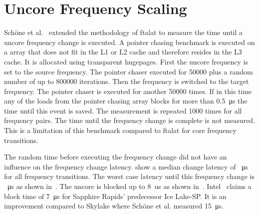 \section{Uncore Frequency Scaling}
\label{sec:uncore_frequency_scaling}
Schöne et al.~\cite{Schoene_2019_SKL} extended the methodology of ftalat to measure the time until a uncore frequency change is executed.
A pointer chasing benchmark is executed on a array that does not fit in the L1 or L2 cache and therefore resides in the L3 cache.
It is allocated using transparent hugepages.
First the uncore frequency is set to the source frequency.
The pointer chaser executed for \SI{50000}{} plus a random number of up to \SI{800000}{} iterations.
Then the frequency is switched to the target frequency.
The pointer chaser is executed for another \SI{50000}{} times.
If in this time any of the loads from the pointer chasing array blocks for more than \SI{0.5}{\us} the time until this event is saved.
The measurement is repeated \SI{1000}{} times for all frequency pairs.
The time until the frequency change is complete is not measured.
This is a limitation of this benchmark compared to ftalat for core frequency transitions.

The random time before executing the frequency change did not have an influence on the frequency change latency.
 show a median change latency of \SI{}{\us} for all frequency transitions.
The worst case latency until this frequency change is \SI{}{\us} as shown in~.
The uncore is blocked up to \SI{8}{us} as shown in~.
Intel~\cite{Intel_2020_IceLake_SP} claims a block time of \SI{7}{\us} for Sapphire Rapids' predecessor Ice Lake-SP.
It is an improvement compared to Skylake where Schöne et al. measured \SI{15}{\us}.

